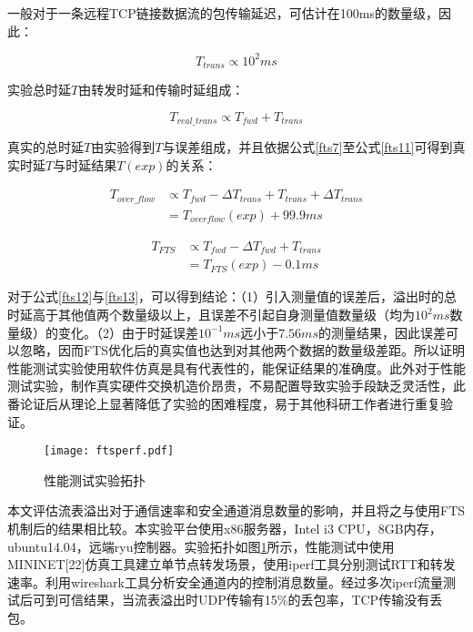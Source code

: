 一般对于一条远程TCP链接数据流的包传输延迟，可估计在100ms的数量级，因此：

\begin{equation}\label{fts10}
T_{trans} \propto 10^{2}ms
\end{equation}

实验总时延$ T $由转发时延和传输时延组成：

\begin{equation}\label{fts11}
T_{real\_trans} \propto T_{fwd} + T_{trans}
\end{equation}

真实的总时延$T$由实验得到$T$与误差组成，并且依据公式\ref{fts7}至公式\ref{fts11}可得到真实时延$T$与时延结果$ T(exp) $的关系：


\begin{align}\label{fts12}
T_{over\_flow} &\propto T_{fwd} - \Delta T_{trans} + T_{trans} + \Delta T_{trans}  \nonumber \\
&=T_{overflow}(exp) + 99.9ms
\end{align}


\begin{align}\label{fts13}
T_{FTS} &\propto T_{fwd} - \Delta T_{fwd} + T_{trans} \nonumber \\
&=T_{FTS}(exp) - 0.1ms
\end{align}

对于公式\ref{fts12}与\ref{fts13}，可以得到结论：（1）引入测量值的误差后，溢出时的总时延高于其他值两个数量级以上，且误差不引起自身测量值数量级（均为$10^2ms$数量级）的变化。（2）由于时延误差$10^{-1}ms $远小于$ 7.56ms$的测量结果，因此误差可以忽略，因而FTS优化后的真实值也达到对其他两个数据的数量级差距。所以证明性能测试实验使用软件仿真是具有代表性的，能保证结果的准确度。此外对于性能测试实验，制作真实硬件交换机造价昂贵，不易配置导致实验手段缺乏灵活性，此番论证后从理论上显著降低了实验的困难程度，易于其他科研工作者进行重复验证。


\begin{figure}[!ht]
	\centering 
	\vspace{-1.5mm} 
	\texttt{[image: ftsperf.pdf]}
	\caption{性能测试实验拓扑} \label{fig:ftsperf}
\end{figure}

本文评估流表溢出对于通信速率和安全通道消息数量的影响，并且将之与使用FTS机制后的结果相比较。本实验平台使用x86服务器，Intel i3 CPU，8GB内存，ubuntu14.04，远端ryu控制器。实验拓扑如图\ref{fig:ftsperf}所示，性能测试中使用MININET[22]仿真工具建立单节点转发场景，使用iperf工具分别测试RTT和转发速率。利用wireshark工具分析安全通道内的控制消息数量。经过多次iperf流量测试后可到可信结果，当流表溢出时UDP传输有15\%的丢包率，TCP传输没有丢包。


